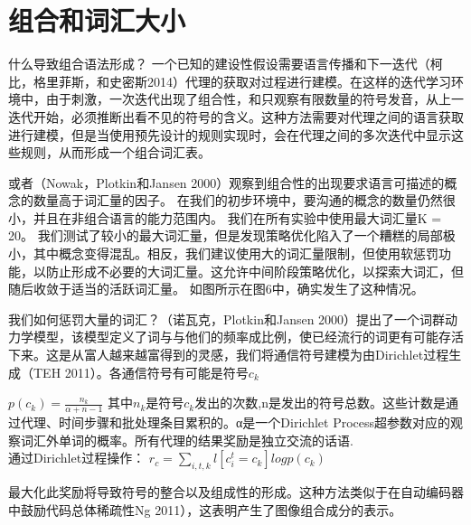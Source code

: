 \section{组合和词汇大小}
什么导致组合语法形成？ 一个已知的建设性假设需要语言传播和下一迭代（柯比，格里菲斯，和史密斯2014）代理的获取对过程进行建模。在这样的迭代学习环境中，由于刺激，一次迭代出现了组合性，和只观察有限数量的符号发音，从上一迭代开始，必须推断出看不见的符号的含义。这种方法需要对代理之间的语言获取进行建模，但是当使用预先设计的规则实现时，会在代理之间的多次迭代中显示这些规则，从而形成一个组合词汇表。
\par 
或者（Nowak，Plotkin和Jansen 2000）观察到组合性的出现要求语言可描述的概念的数量高于词汇量的因子。 在我们的初步环境中，要沟通的概念的数量仍然很小，并且在非组合语言的能力范围内。 我们在所有实验中使用最大词汇量K = 20。 我们测试了较小的最大词汇量，但是发现策略优化陷入了一个糟糕的局部极小，其中概念变得混乱。相反，我们建议使用大的词汇量限制，但使用软惩罚功能，以防止形成不必要的大词汇量。这允许中间阶段策略优化，以探索大词汇，但随后收敛于适当的活跃词汇量。 如图所示在图6中，确实发生了这种情况。
\par
我们如何惩罚大量的词汇？（诺瓦克，Plotkin和Jansen 2000）提出了一个词群动力学模型，该模型定义了词与与他们的频率成比例，使已经流行的词更有可能存活下来。这是从富人越来越富得到的灵感，我们将通信符号建模为由Dirichlet过程生成（TEH 2011）。各通信符号有可能是符号$c_k$
\par 
$p(c_k) = \frac{n_k}{\alpha + n - 1}$
其中$n_k$是符号$c_k$发出的次数,n是发出的符号总数。这些计数是通过代理、时间步骤和批处理条目累积的。α是一个Dirichlet Process超参数对应的观察词汇外单词的概率。所有代理的结果奖励是独立交流的话语.\\
通过Dirichlet过程操作：
$r_c = \sum\limits_{i,t,k}^{}l[c_i^t = c_k]logp(c_k)$
\par 
最大化此奖励将导致符号的整合以及组成性的形成。这种方法类似于在自动编码器中鼓励代码总体稀疏性Ng 2011），这表明产生了图像组合成分的表示。


